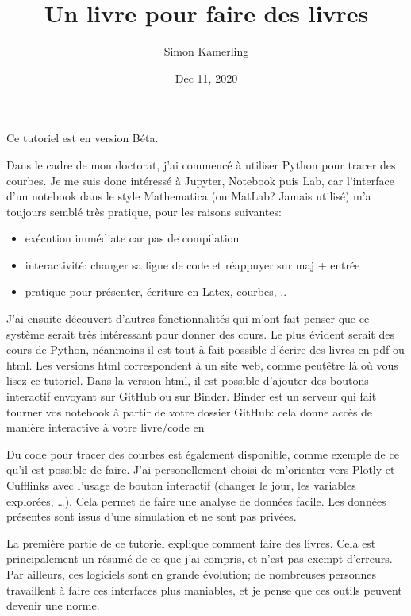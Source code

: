 \documentclass[letterpaper,10pt,english]{sphinxmanual}
\title{Un livre pour faire des livres}
\date{Dec 11, 2020}
\author{Simon Kamerling}
\begin{document}
\pagestyle{empty}
\sphinxmaketitle
\pagestyle{plain}
\sphinxtableofcontents
\pagestyle{normal}
\label{\detokenize{intro::doc}}


Ce tutoriel est en version Béta.

Dans le cadre de mon doctorat, j’ai commencé à utiliser Python pour tracer des courbes. Je me suis donc intéressé à Jupyter, Notebook puis Lab, car l’interface d’un notebook dans le style Mathematica (ou MatLab? Jamais utilisé) m’a toujours semblé très pratique, pour les raisons suivantes:
\begin{itemize}
\item {} 
exécution immédiate car pas de compilation

\item {} 
interactivité: changer sa ligne de code et réappuyer sur maj + entrée

\item {} 
pratique pour présenter, écriture en Latex, courbes, ..

\end{itemize}

J’ai ensuite découvert d’autres fonctionnalités qui m’ont fait penser que ce système serait très intéressant pour donner des cours. Le plus évident serait des cours de Python, néanmoins il est tout à fait possible d’écrire des livres en pdf ou html. Les versions html correspondent à un site web, comme peut\sphinxhyphen{}être là où vous lisez ce tutoriel. Dans la version html, il est possible d’ajouter des boutons interactif envoyant sur GitHub ou sur Binder. Binder est un serveur qui fait tourner vos notebook à partir de votre dossier GitHub: cela donne accès de manière interactive à votre livre/code en 

Du code pour tracer des courbes est également disponible, comme exemple de ce qu’il est possible de faire. J’ai personellement choisi de m’orienter vers Plotly et Cufflinks avec l’usage de bouton interactif (changer le jour, les variables explorées, …). Cela permet de faire une analyse de données facile. Les données présentes sont issus d’une simulation et ne sont pas privées.

La première partie de ce tutoriel explique comment faire des livres. Cela est principalement un résumé de ce que j’ai compris, et n’est pas exempt d’erreurs. Par ailleurs, ces logiciels sont en grande évolution; de nombreuses personnes travaillent à faire ces interfaces plus maniables, et je pense que ces outils peuvent devenir une norme.
\end{document}
